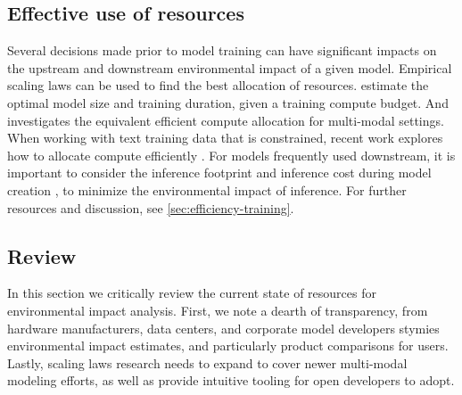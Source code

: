 
% 
 
\subsection{Effective use of resources}
\vspace{-2mm}

Several decisions made prior to model training can have significant impacts on the upstream and downstream environmental impact of a given model.
Empirical scaling laws can be used to find the best allocation of resources.
\citet{kaplan2020scaling, hoffmann2022training} estimate the optimal model size and training duration, given a training compute budget.
And \citet{aghajanyan2023scaling} investigates the equivalent efficient compute allocation for multi-modal settings.
When working with text training data that is constrained, recent work explores how to allocate compute efficiently \citep{muennighoff2023scaling}.
For models frequently used downstream, it is important to consider the inference footprint and inference cost during model creation \citep{gadre2024language}, to minimize the environmental impact of inference. For further resources and discussion, see \ref{sec:efficiency-training}.

% 

\subsection{Review}
\label{sec:environment-review}

In this section we critically review the current state of resources for environmental impact analysis. First, we note a dearth of transparency, from hardware manufacturers, data centers, and corporate model developers stymies environmental impact estimates, and particularly product comparisons for users.
Lastly, scaling laws research needs to expand to cover newer multi-modal modeling efforts, as well as provide intuitive tooling for open developers to adopt.

